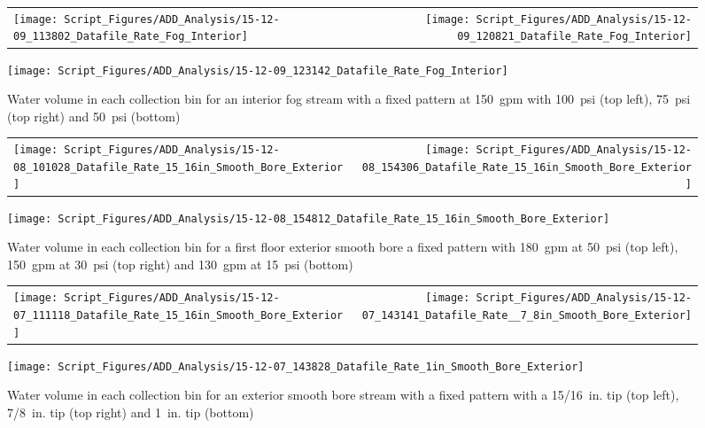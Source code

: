 \documentclass{book}
\begin{document}
\begin{figure}[ht]
\begin{tabular*}{\textwidth}{lr}
\texttt{[image: Script\_Figures/ADD\_Analysis/15-12-09\_113802\_Datafile\_Rate\_Fog\_Interior]} &
\texttt{[image: Script\_Figures/ADD\_Analysis/15-12-09\_120821\_Datafile\_Rate\_Fog\_Interior]} \\
\end{tabular*}
\centering
\texttt{[image: Script\_Figures/ADD\_Analysis/15-12-09\_123142\_Datafile\_Rate\_Fog\_Interior]}
\caption{Water volume in each collection bin for an interior fog stream with a fixed pattern at 150~gpm with 100~psi (top left), 75~psi (top right) and 50~psi (bottom)}
\label{fig:Interior_Varying_Nozzle_Pressure_Fog_Fixed_Pattern}
\end{figure}

\begin{figure}[ht]
\begin{tabular*}{\textwidth}{lr}
\texttt{[image: Script\_Figures/ADD\_Analysis/15-12-08\_101028\_Datafile\_Rate\_15\_16in\_Smooth\_Bore\_Exterior]} &
\texttt{[image: Script\_Figures/ADD\_Analysis/15-12-08\_154306\_Datafile\_Rate\_15\_16in\_Smooth\_Bore\_Exterior]} \\
\end{tabular*}
\centering
\texttt{[image: Script\_Figures/ADD\_Analysis/15-12-08\_154812\_Datafile\_Rate\_15\_16in\_Smooth\_Bore\_Exterior]}
\caption{Water volume in each collection bin for a first floor exterior smooth bore a fixed pattern with 180~gpm at 50~psi (top left), 150~gpm at 30~psi (top right) and 130~gpm at 15~psi (bottom)}
\label{fig:Exterior_First_Floor_Varying_Nozzle_Pressure_SB_Fixed_Pattern}
\end{figure}

\clearpage

\begin{figure}[ht]
\begin{tabular*}{\textwidth}{lr}
\texttt{[image: Script\_Figures/ADD\_Analysis/15-12-07\_111118\_Datafile\_Rate\_15\_16in\_Smooth\_Bore\_Exterior]} &
\texttt{[image: Script\_Figures/ADD\_Analysis/15-12-07\_143141\_Datafile\_Rate\_\_7\_8in\_Smooth\_Bore\_Exterior]} \\
\end{tabular*}
\centering
\texttt{[image: Script\_Figures/ADD\_Analysis/15-12-07\_143828\_Datafile\_Rate\_1in\_Smooth\_Bore\_Exterior]}
\caption{Water volume in each collection bin for an exterior smooth bore stream with a fixed pattern with a 15/16~in. tip (top left), 7/8~in. tip (top right) and 1~in. tip (bottom)}
\label{fig:Exterior_Second_Floor_Varying_Flow_Rates_SB_Fixed_Pattern}
\end{figure}
\end{document}
